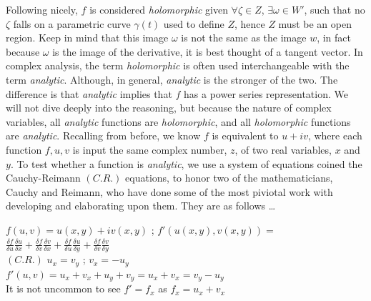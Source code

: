 \documentclass[a4paper,man,natbib]{apa6}
\begin{document}
Following nicely, $ f $ is considered \textit{holomorphic} given $ \forall \zeta \in Z $, $ \exists \omega \in W' $, 
such that no $ \zeta $ falls on a parametric curve $ \gamma(t) $ used to define $ Z $, hence $ Z $ must be an open region.
Keep in mind that this image $ \omega $ is not the same as the image $ w $, in fact because $ \omega $ is the image of the derivative, it is best thought of a tangent vector. 
In complex analysis, the term \textit{holomorphic} is often used interchangeable with the term \textit{analytic}.
Although, in general, \textit{analytic} is the stronger of the two. 
The difference is that \textit{analytic} implies that $ f $ has a power series representation.
We will not dive deeply into the reasoning, but because the nature of complex variables, 
all \textit{analytic} functions are \textit{holomorphic}, and all \textit{holomorphic} functions are \textit{analytic}.
Recalling from before, we know $ f $ is equivalent to $ u +iv $, where each function $ f,u,v $ is input the same complex number, $ z $, of two real variables, $ x $ and $ y $. 
To test whether a function is \textit{analytic}, we use a system of equations coined the Cauchy-Reimann $ (C.R.) $ equations, to honor two of the mathematicians, 
Cauchy and Reimann, who have done some of the most piviotal work with developing and elaborating upon them. They are as follows \dots

\begin{center}

      $ f(u,v) = u(x,y) +iv(x,y) $ ; $ f'(u(x,y),v(x,y)) = $$ \frac{\delta f}{\delta u} \frac{\delta u}{\delta x} + \frac{\delta f}{\delta v} \frac{\delta v}{\delta x} + 
      \frac{\delta f}{\delta u} \frac{\delta u}{\delta y} + \frac{\delta f}{\delta v} \frac{\delta v}{\delta y} $ 
      \\
      $ (C.R.) $ $ u_{x} = v_{y} $ ; $ v_{x} = -u_{y} $ 
      \\
      $ f'(u,v) = u_{x} + v_{x} + u_{y} + v_{y} = u_{x} + v_{x} = v_{y} - u_{y} $
      \\
      It is not uncommon to see $ f' = f_{x} $ as $ f_{x} = u_{x} + v_{x} $

\end{center}
\end{document}
